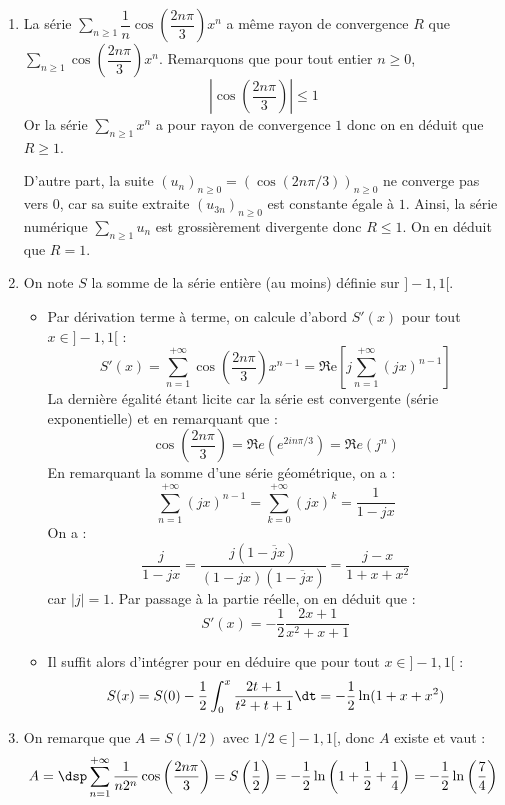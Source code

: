 \documentclass[a4paper,10pt]{report}
\newcommand{\Sum}[2]{\ensuremath{\textstyle{\sum\limits_{#1}^{#2}}}}
\begin{document}
\begin{enumerate}
\item La série $\Sum{n \geq 1}{} \dfrac{1}{n}\cos\left(\dfrac{2n\pi}{3}\right)x^n$ a même rayon de convergence $R$ que $\Sum{n \geq 1}{} \cos\left(\dfrac{2n\pi}{3}\right)x^n$. Remarquons que pour tout entier $n \geq 0$,
\[
 \left\vert \cos\left(\dfrac{2n\pi}{3}\right)\right\vert\leq 1
\]
Or la série $\Sum{n \geq 1}{} x^n$ a pour rayon de convergence $1$ donc on en déduit que $R\geq 1$.

\medskip

D'autre part, la suite $(u_n)_{n \geq 0}=\left(\cos\left(2n\pi/3\right)\right)_{n \geq 0}$ ne converge pas vers $0$, car sa suite extraite $(u_{3n})_{n \geq 0}$ est constante égale à $1$. Ainsi, la série numérique $\Sum{n \geq 1}{} u_n$ est grossièrement divergente donc $R\leq 1$. On en déduit que $R=1$.
\item On note $S$ la somme de la série entière (au moins) définie sur $]-1,1[$.
\begin{itemize}
\item Par dérivation terme à terme, on calcule d'abord $S'(x)$ pour tout $x\in ]-1,1[$ : 
$$ S'(x)  = \sum_{n=1}^{+\infty}\cos\left(\dfrac{2n\pi}{3}\right)x^{n-1} = \Re\mathrm{e}\left[j\sum_{n=1}^{+\infty}(jx)^{n-1}\right]$$
La dernière égalité étant licite car la série est convergente (série exponentielle) et en remarquant que :
$$ \cos\left(\dfrac{2n\pi}{3}\right) = \Re e (e^{2i n \pi/3}) = \Re e (j^n)$$
En remarquant la somme d'une série géométrique, on a :
$$ \sum_{n=1}^{+\infty}(jx)^{n-1} = \sum_{k=0}^{+\infty}(jx)^{k} = \dfrac{1}{1-jx}$$
On a :
$$ \dfrac{j}{1-jx} =  \dfrac{j(1-\overline{j}x)}{(1-jx)(1-\overline{j}x)} =\dfrac{j-x}{1+x+x^2}$$
car $\vert j \vert =1$. Par passage à la partie réelle, on en déduit que :
$$S'(x)  = -\dfrac{1}{2}\dfrac{2x+1}{x^2+x+1}$$

\item Il suffit alors d'intégrer pour en déduire que pour tout $x\in ]-1,1[$ :  
$$ S(x)=S(0)-\dfrac{1}{2}\int_0^x\dfrac{2t+1}{t^2+t+1} \dt=-\dfrac{1}{2}\ln(1+x+x^2)$$

\end{itemize}
\item On remarque que $A=S(1/2)$ avec $1/2\in ]-1,1[$, donc $A$ existe et vaut : 
\[
A=\dsp\sum_{n=1}^{+\infty}\dfrac{1}{n2^n}\cos\left(\dfrac{2n\pi}{3}\right)=S\left(\dfrac{1}{2}\right)=-\dfrac{1}{2}\ln\left(1+\dfrac{1}{2}+\dfrac{1}{4}\right)=-\dfrac{1}{2}\ln\left(\dfrac{7}{4}\right)
\]
\end{enumerate}
\end{document}
